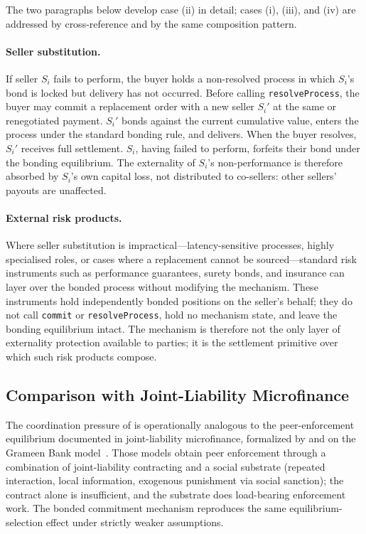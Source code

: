 \documentclass[11pt,a4paper]{article}
\theoremstyle{definition}
\theoremstyle{remark}
\begin{document}
The two paragraphs below develop case (ii) in detail; cases (i),
(iii), and (iv) are addressed by cross-reference and by the same
composition pattern.

\paragraph{Seller substitution.}
If seller $S_i$ fails to perform, the buyer holds a non-resolved
process in which $S_i$'s bond is locked but delivery has not
occurred. Before calling \texttt{resolveProcess}, the buyer may
commit a replacement order with a new seller $S_i'$ at the same or
renegotiated payment. $S_i'$ bonds against the current cumulative
value, enters the process under the standard bonding rule, and
delivers. When the buyer resolves, $S_i'$ receives full settlement.
$S_i$, having failed to perform, forfeits their bond under the
bonding equilibrium. The externality of $S_i$'s non-performance is
therefore absorbed by $S_i$'s own capital loss, not distributed to
co-sellers: other sellers' payouts are unaffected.

\paragraph{External risk products.}
Where seller substitution is impractical---latency-sensitive
processes, highly specialised roles, or cases where a replacement
cannot be sourced---standard risk instruments such as performance
guarantees, surety bonds, and insurance can layer over the bonded
process without modifying the mechanism. These instruments hold
independently bonded positions on the seller's behalf; they do not
call \texttt{commit} or \texttt{resolveProcess}, hold no mechanism
state, and leave the bonding equilibrium intact. The mechanism is
therefore not the only layer of externality protection available to
parties; it is the settlement primitive over which such risk
products compose.

\subsection{Comparison with Joint-Liability Microfinance}
\label{sec:microfinance}

The coordination pressure of  is
operationally analogous to the peer-enforcement equilibrium documented
in joint-liability microfinance, formalized by \citet{ghatak1999} and
\citet{stiglitz1990} on the Grameen Bank model~\citep{yunus1999}.
Those models obtain peer enforcement through a combination of
joint-liability contracting and a social substrate (repeated
interaction, local information, exogenous punishment via social
sanction); the contract alone is insufficient, and the substrate
does load-bearing enforcement work. The bonded commitment mechanism
reproduces the same equilibrium-selection effect under strictly
weaker assumptions.
\end{document}
